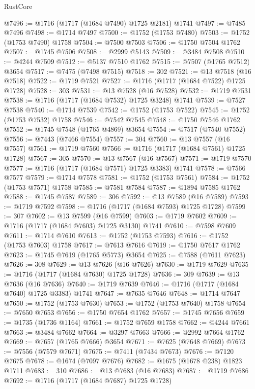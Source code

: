 \begin{lexlean}{RustCore}
\begin{coremodule}
@7496 := @1716 (@1717 (@1684 @7490) @1725 @2181) @1741
@7497 := @7485 @7496
@7498 := @1714 @7497
@7500 := @1752 (@1753 @7480)
@7503 := @1752 (@1753 @7490) @1758
@7504 := @7500 @7503
@7506 := @1750 @7504 @1762
@7507 := @1745 @7506
@7508 := @2999 @5143
@7509 := @3484 @7508
@7510 := @4244 @7509
@7512 := @5137 @7510 @1762
@7515 := @7507 (@1765 @7512) @3654
@7517 := @7475 (@7498 @7515)
@7518 := 302
@7521 := @13 @7518 (@16 @7518)
@7522 := @1719 @7521
@7527 := @1716 (@1717 (@1684 @7522) @1725 @1728)
@7528 := 303
@7531 := @13 @7528 (@16 @7528)
@7532 := @1719 @7531
@7538 := @1716 (@1717 (@1684 @7532) @1725 @3248) @1741
@7539 := @7527 @7538
@7540 := @1714 @7539
@7542 := @1752 (@1753 @7522)
@7545 := @1752 (@1753 @7532) @1758
@7546 := @7542 @7545
@7548 := @1750 @7546 @1762
@7552 := @1745 @7548 (@1765 @4869) @3654
@7554 := @7517 (@7540 @7552)
@7556 := @7443 (@7466 @7554)
@7557 := 304
@7560 := @13 @7557 (@16 @7557)
@7561 := @1719 @7560
@7566 := @1716 (@1717 (@1684 @7561) @1725 @1728)
@7567 := 305
@7570 := @13 @7567 (@16 @7567)
@7571 := @1719 @7570
@7577 := @1716 (@1717 (@1684 @7571) @1725 @3383) @1741
@7578 := @7566 @7577
@7579 := @1714 @7578
@7581 := @1752 (@1753 @7561)
@7584 := @1752 (@1753 @7571) @1758
@7585 := @7581 @7584
@7587 := @1894 @7585 @1762
@7588 := @1745 @7587
@7589 := 306
@7592 := @13 @7589 (@16 @7589)
@7593 := @1719 @7592
@7598 := @1716 (@1717 (@1684 @7593) @1725 @1728)
@7599 := 307
@7602 := @13 @7599 (@16 @7599)
@7603 := @1719 @7602
@7609 := @1716 (@1717 (@1684 @7603) @1725 @3130) @1741
@7610 := @7598 @7609
@7611 := @1714 @7610
@7613 := @1752 (@1753 @7593)
@7616 := @1752 (@1753 @7603) @1758
@7617 := @7613 @7616
@7619 := @1750 @7617 @1762
@7623 := @1745 @7619 (@1765 @5773) @3654
@7625 := @7588 (@7611 @7623)
@7626 := 308
@7629 := @13 @7626 (@16 @7626)
@7630 := @1719 @7629
@7635 := @1716 (@1717 (@1684 @7630) @1725 @1728)
@7636 := 309
@7639 := @13 @7636 (@16 @7636)
@7640 := @1719 @7639
@7646 := @1716 (@1717 (@1684 @7640) @1725 @3383) @1741
@7647 := @7635 @7646
@7648 := @1714 @7647
@7650 := @1752 (@1753 @7630)
@7653 := @1752 (@1753 @7640) @1758
@7654 := @7650 @7653
@7656 := @1750 @7654 @1762
@7657 := @1745 @7656
@7659 := @1735 (@1736 @1164)
@7661 := @1752 @7659 @1758
@7662 := @4244 @7661
@7663 := @3484 @7662
@7664 := @3297 @7663
@7666 := @2992 @7664 @1762
@7669 := @7657 (@1765 @7666) @3654
@7671 := @7625 (@7648 @7669)
@7673 := @7556 (@7579 @7671)
@7675 := @7411 (@7434 @7673)
@7676 := @7120 @7675
@7678 := @1674 (@7097 @7676)
@7682 := @1675 (@1678 @238) @1823 @1711
@7683 := 310
@7686 := @13 @7683 (@16 @7683)
@7687 := @1719 @7686
@7692 := @1716 (@1717 (@1684 @7687) @1725 @1728)

\end{coremodule}
\end{lexlean}
